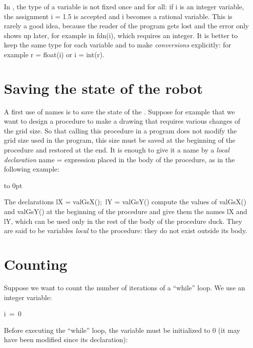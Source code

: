 \noindent  In \python, the type of a variable is not fixed once and for all:
if {\idt i} is an integer variable, the assignment {\idt i = 1.5} is
accepted and {\idt i} becomes a rational variable. This is rarely a good idea, because the
reader of the program gets lost and the error only shows up later, for example in
{\idt fdn(i)}, which requires an integer. It is better to keep the same type for each variable and to make
{\em conversions} explicitly: for example
{\idt r = float(i)} or {\idt i = int(r)}.

\section{Saving the state of the robot}

A first use of names is to save the state of the \robot. Suppose for
example that we want to design a procedure to make a drawing that requires various
changes of the grid size. So that calling
this procedure in a program does not modify the grid size used in the
program, this size must be saved
at the beginning of the procedure and restored at the end. It is enough to give it a
name by a {\em local declaration}
{\idt name = expression} placed in the body of the procedure, as in the following example:

{\raggedright
 \vbox to 0pt{}%
 
 }

\noindent The declarations {\idt lX = valGsX();\ lY = valGsY()}
compute the values of {\idt valGsX()} and {\idt valGsY()} at the beginning of the procedure and
give them the names {\idt lX} and {\idt lY}, which can be used only in the rest of the
body of the procedure {\idt duck}. They are said to be variables {\em local} to the
procedure: they do not exist outside its body.

\section{Counting}
Suppose we want to
count the number of iterations of a ``while'' loop. We use an integer variable:

\mbox{\blc  \blk\idt  i\ =\ 0}\par

\noindent Before executing the ``while'' loop, the variable must be initialized to 0
(it may have been modified since its declaration):

